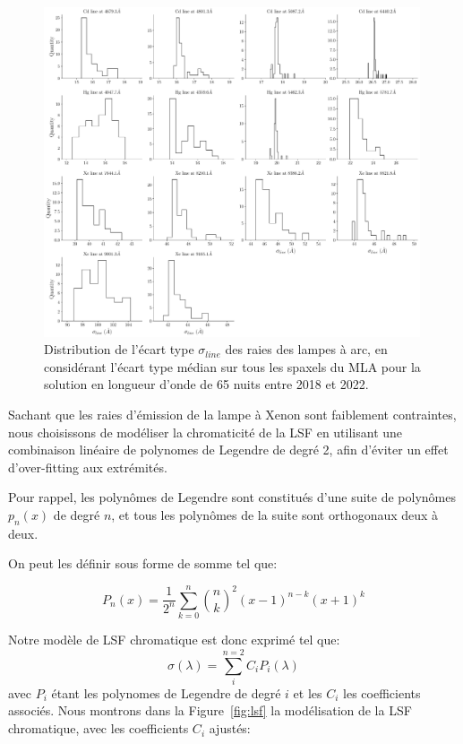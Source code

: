 \documentclass[../main/main.tex]{subfiles}
\begin{document}
\begin{figure}[h!]
  \centering
  \includegraphics[width=0.99\textwidth]{../figures/06_irf/linestd.pdf}
  \caption[Distribution de l'écart type $\sigma_{line}$ des raies des
  lampes à arc]{Distribution de l'écart type $\sigma_{line}$ des raies
    des lampes à arc, en
    considérant l'écart type médian sur tous les spaxels du MLA pour la
    solution en longueur d'onde de 65 nuits entre 2018 et 2022.}
  \label{fig:linestd}
\end{figure}

Sachant que les raies d'émission de la lampe à Xenon sont faiblement
contraintes, nous choisissons de modéliser la chromaticité de la LSF en
utilisant une combinaison linéaire de polynomes de Legendre de degré 2, afin d'éviter un effet
d'over-fitting aux extrémités.

Pour rappel, les polynômes de Legendre sont
constitués d'une suite de polynômes $p_{n}(x)$ de degré
$n$, et tous les polynômes de la suite sont orthogonaux deux à deux.

On peut les définir sous forme de somme tel que:

\begin{equation}
  \label{eq:legendre}
  P_{n}(x)=\frac{1}{2^{n}}\sum\limits^{n}_{k=0}\binom{n}{k}^{2}(x-1)^{n-k}(x+1)^{k}
\end{equation} 

Notre modèle de LSF chromatique est donc exprimé tel que:
\begin{equation}
  \label{eq:lsfmodel}
  \sigma(\lambda)=\sum\limits_{i}^{n=2}C_{i}P_{i}(\lambda)
\end{equation}
avec $P_{i}$ étant les polynomes de Legendre de degré $i$ et les $C_{i}$
les coefficients associés. Nous montrons dans la Figure~\ref{fig:lsf} la modélisation de la LSF
chromatique, avec les coefficients $C_{i}$ ajustés:
\end{document}

